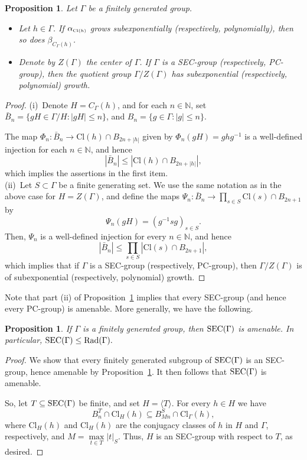 \documentclass[12pt]{amsart}
\newtheorem{prop}[theorem]{Proposition}
\theoremstyle{definition}
\theoremstyle{remark}
\newcommand{\bN}{{\mathbb{N}}}
\newcommand{\G}{\Gamma}
\begin{document}
\begin{prop}\label{pcamenable}
Let $\G$ be a finitely generated group. 
\begin{itemize}
\item[(i)]
Let $h\in\G$. If 
$\alpha_{\scriptscriptstyle{\rm Cl}(h)}$ grows subexponentially \textup{(}respectively, polynomially\textup{)}, then so does $\beta_{\scriptscriptstyle C_\G(h)}$.
\item[(ii)]
Denote by $Z(\Gamma)$ the center of $\G$.
If $\G$ is a SEC-group \textup{(}respectively, PC-group\textup{)}, then the quotient group $\G/Z(\G)$ has subexponential \textup{(}respectively, polynomial\textup{)} growth.
\end{itemize}
\end{prop}

\begin{proof}
(i)\ 
Denote $H=C_\G(h)$, and for each $n\in\mathbb{N}$, set $\bar{B}_n 
= \{gH\in\G/H: |gH| \le n\}$, and $B_n 
= \{g\in\Gamma: |g| \le n\}$. 

The map $\Phi_n: \bar{B}_n\to \text{Cl}(h)\cap B_{2n+|h|}$ given by
$
\Phi_n(gH) = ghg^{-1}
$
is a well-defined injection for each $n\in\mathbb{N}$, and hence 
\[
|\bar{B}_n|\leq |\text{Cl}(h)\cap B_{2n+|h|}| ,
\]
which implies the assertions in the first item. 
\\[1ex]
(ii)\
Let $S\subset \G$ be a finite generating set.
We use the same notation as in the above case for $H=Z(\G)$, and define 
the maps $\Psi_n: \bar{B}_n\to \prod_{s\in S}\text{Cl}(s)\cap B_{2n+1}$ by
\[
\Psi_n(gH) = (g^{-1}sg)_{s\in S} .
\]
Then, $\Psi_n$
is a well-defined injection for every $n\in\bN$, and hence 
\[
|\bar{B}_n|\leq \prod_{s\in S}|\text{Cl}(s)\cap B_{2n+1}| ,
\]
which implies that if $\G$ is a SEC-group (respectively, PC-group), then $\G/Z(\G)$ is of subexponential (respectively, polynomial) growth.
\end{proof}

Note that part (ii) of Proposition~\ref{pcamenable} implies that every SEC-group (and hence every PC-group) is amenable. 
More generally, we have the following.


\begin{prop}\label{pcar}
If $\G$ is a finitely generated group, then 
$\textup{SEC}(\G)$ is amenable. In particular, $\textup{SEC}(\Gamma)\leq \textup{Rad}(\Gamma).$
\end{prop}

\begin{proof}
We show that every finitely generated subgroup of $\textup{SEC}(\G)$ is an SEC-group, hence amenable by Proposition~\ref{pcamenable}. It then follows that $\textup{SEC}(\G)$ is amenable. 

So, let $T\subseteq \textup{SEC}(\Gamma)$ be finite, and set $H = \langle T\rangle$. 
For every $h\in H$ we have
\[
B_n^T\cap \text{Cl}_H(h)\subseteq B_{Mn}^S\cap \text{Cl}_{\Gamma}(h),
\]
where $\text{Cl}_H(h)$ and $\text{Cl}_H(h)$ are the conjugacy classes of $h$ in $H$ and $\G$, respectively, and $M = \max\limits_{t\in T}|t|_S$. Thus,  
$H$ is an SEC-group with respect to $T$, as desired.
\end{proof}
\end{document}
